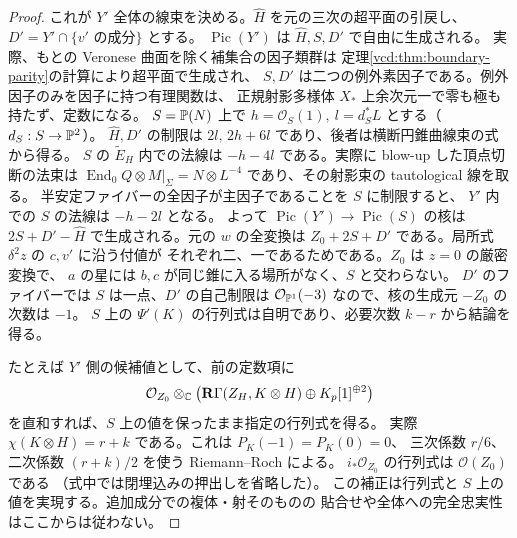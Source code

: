 \begin{proof}
これが $Y'$ 全体の線束を決める。$\widehat H$ を元の三次の超平面の引戻し、
$D'=Y'\cap\{v'\text{ の成分}\}$ とする。
$\operatorname{Pic}(Y')$ は $\widehat H,S,D'$ で自由に生成される。
実際、もとの Veronese 曲面を除く補集合の因子類群は
定理\ref{vcd:thm:boundary-parity}の計算により超平面で生成され、
$S,D'$ は二つの例外素因子である。例外因子のみを因子に持つ有理関数は、
正規射影多様体 $X_*$ 上余次元一で零も極も持たず、定数になる。
$S=\mathbb P(N)$ 上で $h=\mathcal O_S(1),\ l=d_S^*L$ とする（$d_S:S\to\mathbb P^2$）。
$\widehat H,D'$ の制限は $2l,\,2h+6l$ であり、後者は横断円錐曲線束の式から得る。
$S$ の $\widetilde E_H$ 内での法線は $-h-4l$ である。実際に blow-up
した頂点切断の法束は $\operatorname{End}_0Q\otimes M|_\Sigma=N\otimes L^{-4}$
であり、その射影束の tautological 線を取る。
半安定ファイバーの全因子が主因子であることを $S$ に制限すると、
$Y'$ 内での $S$ の法線は $-h-2l$ となる。
よって $\operatorname{Pic}(Y')\to\operatorname{Pic}(S)$ の核は
$2S+D'-\widehat H$ で生成される。元の $w$ の全変換は
$Z_0+2S+D'$ である。局所式 $\delta^2 z$ の $c,v'$ に沿う付値が
それぞれ二、一であるためである。$Z_0$ は $z=0$ の厳密変換で、
$a$ の星には $b,c$ が同じ錐に入る場所がなく、$S$ と交わらない。
$D'$ のファイバーでは $S$ は一点、$D'$ の自己制限は
$\mathcal O_{\mathbb P^1}(-3)$ なので、核の生成元 $-Z_0$ の次数は $-1$。
$S$ 上の $\Psi'(K)$ の行列式は自明であり、必要次数 $k-r$ から結論を得る。

たとえば $Y'$ 側の候補値として、前の定数項に
\[
 \mathcal O_{Z_0}\otimes_{\mathbb C}
       \big(\mathbf R\Gamma(Z_H,K\otimes H)\oplus K_p[1]^{\oplus2}\big)
\]
を直和すれば、$S$ 上の値を保ったまま指定の行列式を得る。
実際 $\chi(K\otimes H)=r+k$ である。これは $P_K(-1)=P_K(0)=0$、
三次係数 $r/6$、二次係数 $(r+k)/2$ を使う Riemann--Roch による。
$i_*\mathcal O_{Z_0}$ の行列式は $\mathcal O(Z_0)$ である
（式中では閉埋込みの押出しを省略した）。
この補正は行列式と $S$ 上の値を実現する。追加成分での複体・射そのものの
貼合せや全体への完全忠実性はここからは従わない。
\end{proof}
